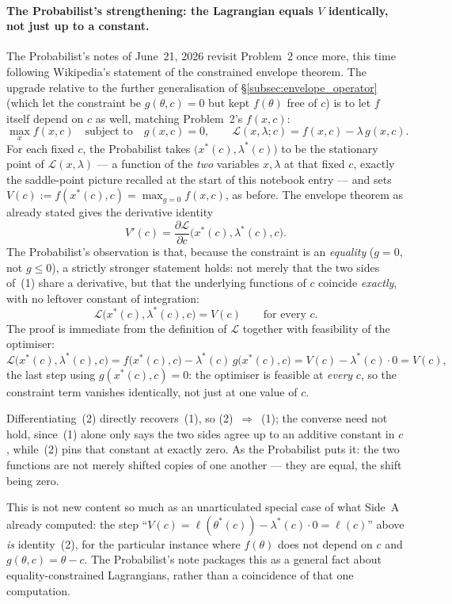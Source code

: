 \documentclass[a4paper,oneside,12pt]{extarticle}
\theoremstyle{plain}
\theoremstyle{definition}
\theoremstyle{remark}
\begin{document}
\paragraph{The Probabilist's strengthening: the Lagrangian equals $V$
identically, not just up to a constant.}
The Probabilist's notes of June~21, 2026 revisit Problem~2 once more, this time
following Wikipedia's statement of the constrained envelope theorem.
The upgrade relative to the further generalisation of
\S\ref{subsec:envelope_operator} (which let the constraint be
$g(\theta,c)=0$ but kept $f(\theta)$ free of $c$) is to let $f$
itself depend on $c$ as well, matching Problem~2's
$f(x,c)$:
\[
  \max_x f(x,c) \quad\text{subject to}\quad g(x,c)=0,
  \qquad
  \mathcal{L}(x,\lambda;c) = f(x,c) - \lambda\,g(x,c).
\]
For each fixed $c$, the Probabilist takes $\big(x^*(c),\lambda^*(c)\big)$ to be
the stationary point of $\mathcal{L}(x,\lambda)$ --- a function of
the \emph{two} variables $x,\lambda$ at that fixed $c$, exactly the
saddle-point picture recalled at the start of this notebook entry
--- and sets $V(c):=f(x^*(c),c)=\max_{g=0}f(x,c)$, as before. The
envelope theorem as already stated gives the derivative identity
\[
  V'(c) = \frac{\partial \mathcal{L}}{\partial c}
  \Big(x^*(c),\lambda^*(c),c\Big). \tag{1}
\]
The Probabilist's observation is that, because the constraint is an
\emph{equality} ($g=0$, not $g\le 0$), a strictly stronger statement
holds: not merely that the two sides of~(1) share a derivative, but
that the underlying functions of $c$ coincide \emph{exactly}, with
no leftover constant of integration:
\[
  \mathcal{L}\big(x^*(c),\lambda^*(c),c\big) = V(c)
  \qquad\text{for every } c. \tag{2}
\]
The proof is immediate from the definition of $\mathcal{L}$ together
with feasibility of the optimiser:
\[
  \mathcal{L}\big(x^*(c),\lambda^*(c),c\big)
  = f\big(x^*(c),c\big) - \lambda^*(c)\,g\big(x^*(c),c\big)
  = V(c) - \lambda^*(c)\cdot 0 = V(c),
\]
the last step using $g(x^*(c),c)=0$: the optimiser is feasible at
\emph{every} $c$, so the constraint term vanishes identically, not
just at one value of $c$.

Differentiating~(2) directly recovers~(1), so (2)~$\Rightarrow$~(1);
the converse need not hold, since~(1) alone only says the two sides
agree up to an additive constant in $c$, while~(2) pins that
constant at exactly zero. As the Probabilist puts it: the two functions are
not merely shifted copies of one another --- they are equal, the
shift being zero.

This is not new content so much as an unarticulated special case of
what Side~A already computed: the step
``$V(c)=\ell(\theta^*(c))-\lambda^*(c)\cdot 0=\ell(c)$'' above
\emph{is} identity~(2), for the particular instance where
$f(\theta)$ does not depend on $c$ and $g(\theta,c)=\theta-c$. The Probabilist's
note packages this as a general fact about equality-constrained
Lagrangians, rather than a coincidence of that one computation.
\end{document}
